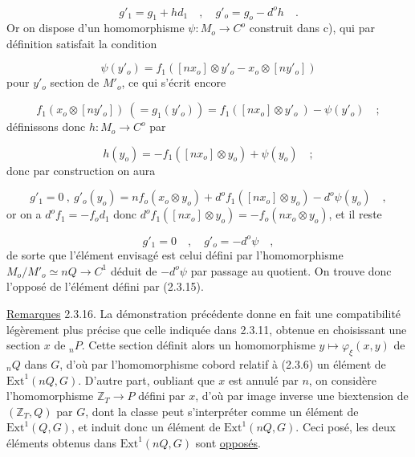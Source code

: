 \begin{equation*}
g'_1 = g_1 + hd_1 \quad , \quad g'_o = g_o - d^o h \quad .
\end{equation*}
Or on dispose d'un homomorphisme $\psi : M_o \longrightarrow C^o$ construit dans c), qui par définition satisfait la condition

\begin{equation*}
\psi(y'_o) = f_1([nx_o] \otimes y'_o - x_o \otimes [ny'_o])
\end{equation*}
pour $y'_o$ section de $M'_o$, ce qui s'écrit encore

\begin{equation*}
f_1(x_o \otimes [ny'_o]) \ (= g_1(y'_o)) = f_1([nx_o] \otimes y'_o \ ) - \psi(y'_o) \quad ;
\end{equation*}
définissons donc $h : M_o \longrightarrow C^o$ par 



\begin{equation*}
 h(y_o) = -f_1([nx_o] \otimes y_o) + \psi(y_o) \quad ;
\end{equation*}
donc par construction on aura

\begin{equation*}
g'_1 = 0 \ , \ g'_o(y_o) = nf_o(x_o \otimes y_o) + d^o f_1([nx_o] \otimes y_o) - d^o \psi(y_o) \quad ,
\end{equation*}
or on a $d^o f_1 = -f_o d_1$ donc $d^o f_1([nx_o] \otimes y_o) = - f_o(nx_o \otimes y_o)$, et il reste

\begin{equation*}
g'_1 = 0 \quad , \quad g'_o = -d^o \psi \quad ,
\end{equation*}
de sorte que l'élément envisagé est celui défini par l'homomorphisme $M_o/M'_o \simeq nQ \longrightarrow C^1$ déduit de $- d^o \psi$ par passage au quotient. On trouve donc l'opposé de l'élément défini par (2.3.15).

\underline{Remarques} 2.3.16. \quad La démonstration précédente donne en fait une compatibilité légèrement plus précise que celle indiquée dans 2.3.11, obtenue en choisissant une section $x$ de ${}_nP$. Cette section définit alors un homomorphisme $y \longmapsto \varphi_\xi(x,y)$ de ${}_nQ$ dans $G$, d'où par l'homomorphisme cobord relatif à (2.3.6) un élément de $\mathrm{Ext}^1(nQ,G)$. D'autre part, oubliant que $x$ est annulé par $n$, on considère l'homomorphisme $\mathbb{Z}_T \longrightarrow P$ défini par $x$, d'où par image inverse une biextension de $(\mathbb{Z}_T,Q)$ par $G$, dont la classe peut s'interpréter comme un élément de $\mathrm{Ext}^1(Q,G)$, et induit donc un élément de $\mathrm{Ext}^1(nQ,G)$. Ceci posé, les deux éléments obtenus dans $\mathrm{Ext}^1(nQ,G)$ sont \underline{opposés}.

